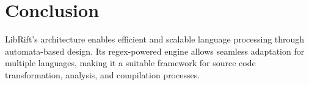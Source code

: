\documentclass{article}
\begin{document}
\section{Conclusion}

LibRift's architecture enables efficient and scalable language processing through automata-based design. Its regex-powered engine allows seamless adaptation for multiple languages, making it a suitable framework for source code transformation, analysis, and compilation processes.
\end{document}
